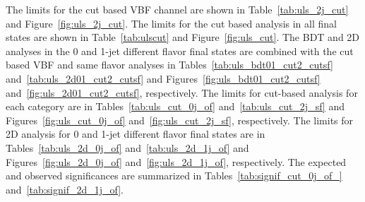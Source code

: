 The limits for the cut based VBF channel are shown in 
Table~\ref{tab:uls_2j_cut} and Figure~\ref{fig:uls_2j_cut}.
The limits for the cut based analysis in all final states are shown in
Table~\ref{tab:ulscut} and Figure~\ref{fig:uls_cut}.
The BDT and 2D analyses in the 0 and 1-jet different flavor final states
are combined with the cut based VBF and same flavor analyses in
Tables~\ref{tab:uls_bdt01_cut2_cutsf} and~\ref{tab:uls_2d01_cut2_cutsf}
and Figures~\ref{fig:uls_bdt01_cut2_cutsf} and~\ref{fig:uls_2d01_cut2_cutsf}, 
respectively.
The limits for cut-based analysis for each category are in 
Tables~\ref{tab:uls_cut_0j_of} and~\ref{tab:uls_cut_2j_sf}
and Figures~\ref{fig:uls_cut_0j_of} and~\ref{fig:uls_cut_2j_sf},
respectively.
The limits for 2D analysis for 0 and 1-jet different flavor final states are in 
Tables~\ref{tab:uls_2d_0j_of} and~\ref{tab:uls_2d_1j_of}
and Figures~\ref{fig:uls_2d_0j_of} and~\ref{fig:uls_2d_1j_of},
respectively.
The expected and observed significances are summarized in Tables~\ref{tab:signif_cut_0j_of_} and~\ref{tab:signif_2d_1j_of}. 

